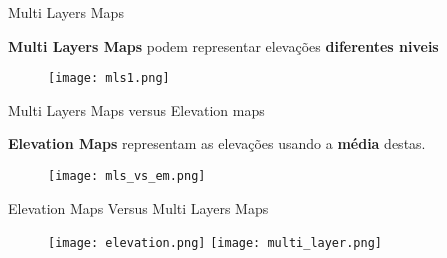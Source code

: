 
\begin{frame}[t]{Multi Layers Maps}

    \textbf{Multi Layers Maps} podem representar elevações \textbf{diferentes niveis}
    \vskip0.25cm
    \begin{figure}

        \texttt{[image: mls1.png]}%
        
    
    \end{figure}
\end{frame}


\begin{frame}[t]{Multi Layers Maps versus Elevation maps}

    \textbf{Elevation Maps} representam as elevações usando a \textbf{média} destas.
    
    \begin{figure}

        \texttt{[image: mls\_vs\_em.png]}%
        
    
    \end{figure}
\end{frame}


\begin{frame}[t]{Elevation Maps Versus Multi Layers Maps}

  
    
    \begin{figure}
        \texttt{[image: elevation.png]}
        \texttt{[image: multi\_layer.png]}
        \label{label_here} 
    \end{figure}



    
\end{frame}

